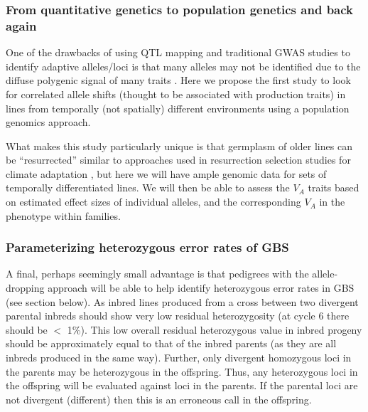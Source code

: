 \documentclass[draft,12pt]{article}
\begin{document}
\subsubsection*{From quantitative genetics to population genetics and back again}
One of the drawbacks of using QTL mapping and traditional GWAS studies to identify adaptive alleles/loci is that many alleles may not be identified due to the diffuse polygenic signal of many traits \cite{Rockman:2011ej, Berg:2014bs}. 
Here we propose the first study to look for correlated allele shifts (thought to be associated with production traits) in lines from temporally (not spatially) different environments using a population genomics approach.
\par What makes this study particularly unique is that germplasm of older lines can be ``resurrected'' similar to approaches used in resurrection selection studies for climate adaptation \cite{Franks:2007be}, but here we will have ample genomic data for sets of temporally differentiated lines. 
We will then be able to assess the $V_{A}$ traits based on estimated effect sizes of individual alleles, and the corresponding $V_{A}$ in the phenotype within families.

 

\subsubsection*{Parameterizing heterozygous error rates of GBS}
A final, perhaps seemingly small advantage is that pedigrees with the allele-dropping approach will be able to help identify heterozygous error rates in GBS (see section below). As inbred lines produced from a cross between two divergent parental inbreds should show very low residual heterozygosity (at cycle 6 there should be $<$ 1\%).
This low overall residual heterozygous value in inbred progeny should be approximately equal to that of the inbred parents (as they are all inbreds produced in the same way). 
Further, only divergent homozygous loci in the parents may be heterozygous in the offspring.
Thus, any heterozygous loci in the offspring will be evaluated against loci in the parents. If the parental loci are not divergent (different) then this is an erroneous call in the offspring.  
\end{document}
